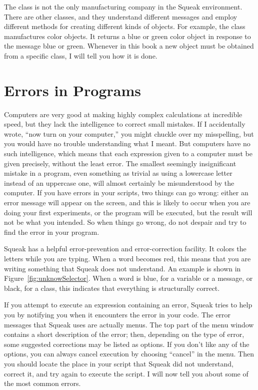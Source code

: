 \documentclass[a4paper,10pt,twoside]{book}
\begin{document}
The  class is not the only manufacturing company in the Squeak environment. There 
are other classes, and they understand different messages and employ different methods for 
creating different kinds of objects. For example, the class  manufactures color objects. It 
returns a blue or green color object in response to the message blue or green. Whenever in this 
book a new object must be obtained from a specific class, I will tell you how it is done. 


\section{Errors in Programs}

Computers are very good at making highly complex calculations at incredible speed, but 
they lack the intelligence to correct small mistakes. If I accidentally wrote, “now turn on your 
computer,” you might chuckle over my misspelling, but you would have no trouble understanding what I meant. But computers have no such intelligence, which means that each 
expression given to a computer must be given precisely, without the least error. The smallest 
seemingly insignificant mistake in a program, even something as trivial as using a lowercase 
letter instead of an uppercase one, will almost certainly be misunderstood by the computer. If 
you have errors in your scripts, two things can go wrong: either an error message will appear 
on the screen, and this is likely to occur when you are doing your first experiments, or the program will be executed, but the result will not be what you intended. So when things go wrong, 
do not despair and try to find the error in your program. 

Squeak has a helpful error-prevention and error-correction facility. It colors the letters 
while you are typing. When a word becomes red, this means that you are writing something 
that Squeak does not understand. An example is shown in Figure~\ref{fig:unknowSelector}. When a word is blue, for 
a variable or a message, or black, for a class, this indicates that everything is structurally correct. 

If you attempt to execute an expression containing an error, Squeak tries to help you by 
notifying you when it encounters the error in your code. The error messages that Squeak uses 
are actually menus. The top part of the menu window contains a short description of the 
error; then, depending on the type of error, some suggested corrections may be listed as 
options. If you don’t like any of the options, you can always cancel execution by choosing 
“cancel” in the menu. Then you should locate the place in your script that Squeak did not 
understand, correct it, and try again to execute the script. 
I will now tell you about some of the most common errors. 
\end{document}

